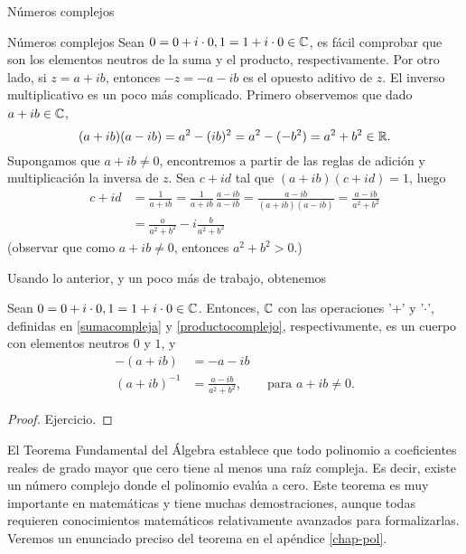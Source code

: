 \begin{chapter}{N\'umeros complejos}
\begin{section}{N\'umeros complejos}
    Sean $0 = 0 + i\cdot 0, 1 = 1 + i\cdot 0 \in \mathbb C$,  es fácil comprobar que son los elementos neutros de la suma y el producto,  respectivamente. Por otro lado, si $z = a + ib$,  entonces $-z = -a -ib$ es el opuesto aditivo de $z$.
    El inverso multiplicativo es un poco más complicado. Primero observemos que dado $a+ib \in \mathbb C$,
    \begin{equation*}
        (a+ ib)(a-ib) = a^2 -(ib)^2 = a^2 -(-b^2) = a^2 + b^2 \in \mathbb R.
    \end{equation*}
    Supongamos que $a+ib\ne0$,  encontremos  a partir  de las reglas de adición y multiplicación la inversa de $z$. Sea $c+id$ tal que $(a+ib)(c+id)=1$, luego
    \begin{align*}
        c + id & = \frac{1}{a+ib} = \frac{1}{a+ib}\,\frac{a-ib}{a-ib} = \frac{a-ib}{(a+ib)(a-ib)} =
        \frac{a-ib}{ a^2 + b^2}                                                                     \\
            & = \frac{a}{ a^2 + b^2} - i\frac{b}{ a^2 + b^2}
    \end{align*}
    (observar que como $a+ib\ne0$,  entonces $a^2 + b^2 >0$.)

    Usando lo anterior,  y un poco más de trabajo, obtenemos

    \begin{proposicion}
        Sean $0 = 0 + i\cdot 0, 1 = 1 + i\cdot 0\in \mathbb C$. Entonces, $\mathbb C$ con las operaciones '$+$' y '$\cdot$', definidas en \eqref{sumacompleja} y
        \eqref{productocomplejo},  respectivamente, es un cuerpo con elementos neutros $0$ y $1$, y
        \begin{align*}
            -(a+ib)     & = -a -ib                                                    \\
            (a+ib)^{-1} & = 	\frac{a-ib}{ a^2 + b^2}, \qquad \text{para $a+ib \ne 0$}.
        \end{align*}
    \end{proposicion}
    \begin{proof}
        Ejercicio.
    \end{proof}


    \begin{observacion}
        El Teorema Fundamental del Álgebra establece que todo polinomio a coeficientes reales de grado mayor que cero tiene al menos una raíz compleja. Es decir, existe un número complejo donde el polinomio evalúa a cero. Este teorema es muy importante en matemáticas y tiene muchas demostraciones, aunque todas requieren conocimientos matemáticos relativamente avanzados para formalizarlas. Veremos un enunciado preciso del teorema en el apéndice \ref{chap-pol}.
    \end{observacion}


\end{section}
\end{chapter}
